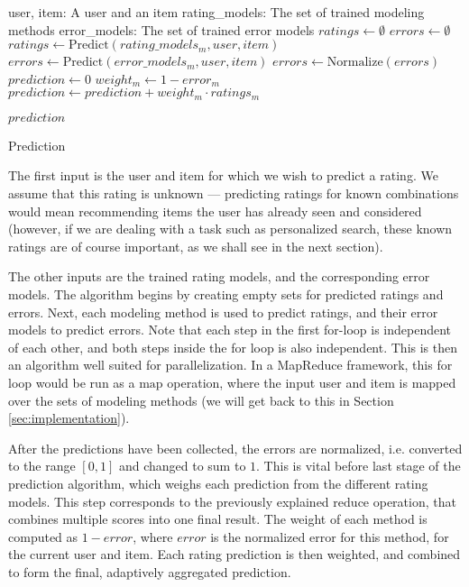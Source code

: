 \begin{algorithm}
  \begin{algorithmic}[1]
  \REQUIRE user, item: A user and an item
  \REQUIRE rating\_models: The set of trained modeling methods 
  \REQUIRE error\_models: The set of trained error models
  \ENSURE
    \STATE $ratings \gets \emptyset$
    \STATE $errors  \gets \emptyset$
      \STATE $ratings \gets \mathrm{Predict}(rating\_models_m, user, item)$
      \STATE $errors  \gets \mathrm{Predict}(error\_models_m, user, item)$
    \ENDFOR 
    \STATE $errors \gets \mathrm{Normalize}(errors)$
    \STATE $prediction \gets 0$
      \STATE $weight_m \gets 1 - error_m$
      \STATE $prediction \gets prediction + weight_m \cdot ratings_m$
    \ENDFOR
 
  \RETURN $prediction$
  \end{algorithmic}
  \caption[Prediction]{Prediction
  }
  \label{code:prediction}
\end{algorithm}

The first input is the user and item for which we wish to predict a rating.
We assume that this rating is unknown --- predicting ratings for known combinations
would mean recommending items the user has already seen and considered
(however, if we are dealing with a task such as personalized search,
these known ratings are of course important, as we shall see in the next section).

The other inputs are the trained rating models, and the corresponding error models.
The algorithm begins by creating empty sets for predicted ratings and errors.
Next, each modeling method is used to predict ratings, and their error models to predict errors.
Note that each step in the first for-loop is independent of each other, and both steps
inside the for loop is also independent. This is then an algorithm well suited for
parallelization.
In a MapReduce framework, this for loop would be run as a $\mathrm{map}$ operation,
where the input user and item is mapped over the sets of modeling methods
(we will get back to this in Section \ref{sec:implementation}).

After the predictions have been collected, the errors are normalized,
i.e. converted to the range $[0,1]$ and changed to sum to $1$.
This is vital before last stage of the prediction algorithm,
which weighs each prediction from the different rating models.
This step corresponds to the previously explained $\mathrm{reduce}$ operation,
that combines multiple scores into one final result.
The weight of each method is computed as $1 - error$, where $error$ 
is the normalized error for this method, for the current user and item.
Each rating prediction is then weighted, and combined to form the final,
adaptively aggregated prediction.


